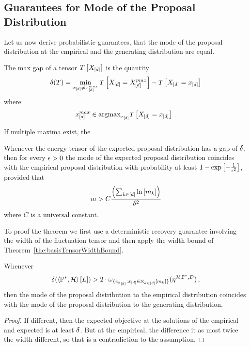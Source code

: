 \subsection{Guarantees for Mode of the Proposal Distribution}

Let us now derive probabilistic guarantees, that the mode of the proposal distribution at the empirical and the generating distribution are equal.

\begin{definition}
	The max gap of a tensor $T\left[X_{[d]}\right]$ is the quantity
		\[ \delta(T) 
		= \min_{x_{[d]} \neq x_{[d]}^{max}} T\left[X_{[d]} = X_{[d]}^{max}\right] - T\left[X_{[d]}=x_{[d]}\right] \]
	where
		\[ x_{[d]}^{max} \in \mathrm{argmax}_{x_{[d]}} T\left[X_{[d]}=x_{[d]}\right] \, . \]
\end{definition}

If multiple maxima exist, the



\begin{theorem}\label{the:probGuaranteeProposalDist}
	Whenever the energy tensor of the expected proposal distribution has a gap of $\delta$, then for every $\epsilon>0$ the mode of the expected proposal distribution coincides with the empirical proposal distribution with probability at least $1-\mathrm{exp}\left[-\frac{1}{\epsilon^2}\right]$, provided that
		\[ m > C\frac{\left(\sum_{k\in[d]}\ln \left[ m_{k} \right]\right)}{\delta^2} \]
	where $C$ is a universal constant.
\end{theorem}

To proof the theorem we first use a deterministic recovery guarantee involving the width of the fluctuation tensor and then apply the width bound of Theorem~\ref{the:basisTensorWidthBound}.

\begin{lemma}\label{lem:detGuaranteeProposalDist}
	Whenever 
	\begin{align*}
		\delta(\left\langle \mathbb{P}^*,\mathcal{H}\right\rangle \left[ L \right]) 
		> 2 \cdot  \omega_{\{e_{x_{[d]}} :x_{[d]}\in\bigtimes_{k\in[d]}[m_{k}]\}}(\eta^{\mathcal{H},\mathbb{P}^*,D}) \, , 
	\end{align*}
	then the mode of the proposal distribution to the empirical distribution coincides with the mode of the proposal distribution to the generating distribution.
\end{lemma}
\begin{proof}
	If different, then the expected objective at the solutions of the empirical and expected is at least $\delta$.
	But at the empirical, the difference it as most twice the width different, so that is a contradiction to the assumption.
\end{proof}


